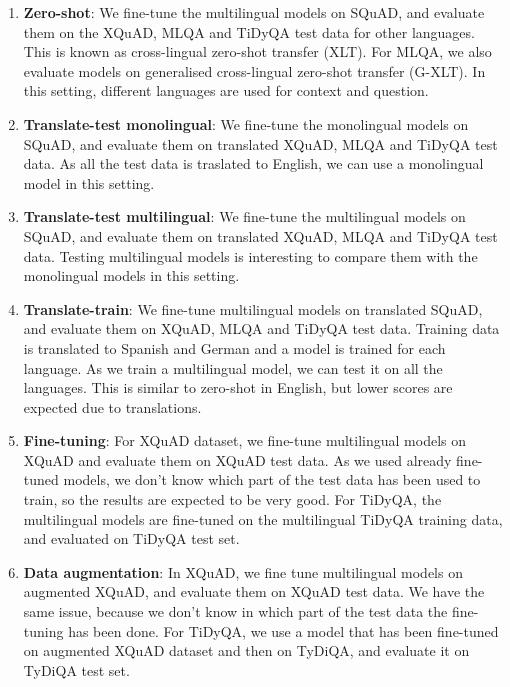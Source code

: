 \documentclass[11pt]{article}
\begin{document}
\begin{enumerate}
    \item \textbf{Zero-shot}: We fine-tune the multilingual models on SQuAD, and evaluate them on the XQuAD, MLQA and TiDyQA test data for other languages. This is known as cross-lingual zero-shot transfer (XLT). For MLQA, we also evaluate models on generalised cross-lingual zero-shot transfer (G-XLT). In this setting, different languages are used for context and question.
    
    \item \textbf{Translate-test monolingual}: We fine-tune the monolingual models on SQuAD, and evaluate them on translated XQuAD, MLQA and TiDyQA test data. As all the test data is traslated to English, we can use a monolingual model in this setting.
    
    \item \textbf{Translate-test multilingual}: We fine-tune the multilingual models on SQuAD, and evaluate them on translated XQuAD, MLQA and TiDyQA test data. Testing multilingual models is interesting to compare them with the monolingual models in this setting.
    
    \item \textbf{Translate-train}: We fine-tune multilingual models on translated SQuAD, and evaluate them on XQuAD, MLQA and TiDyQA test data. Training data is translated to Spanish and German and a model is trained for each language. As we train a multilingual model, we can test it on all the languages. This is similar to zero-shot in English, but lower scores are expected due to translations.
    
    \item \textbf{Fine-tuning}: For XQuAD dataset, we fine-tune multilingual models on XQuAD and evaluate them on XQuAD test data. As we used already fine-tuned models, we don't know which part of the test data has been used to train, so the results are expected to be very good. For TiDyQA, the multilingual models are fine-tuned on the multilingual TiDyQA training data, and evaluated on TiDyQA test set.
    
    \item \textbf{Data augmentation}: In XQuAD, we fine tune multilingual models on augmented XQuAD, and evaluate them on XQuAD test data. We have the same issue, because we don't know in which part of the test data the fine-tuning has been done. For TiDyQA, we use a model that has been fine-tuned on augmented XQuAD dataset and then on TyDiQA, and evaluate it on TyDiQA test set.
\end{enumerate}
\end{document}
